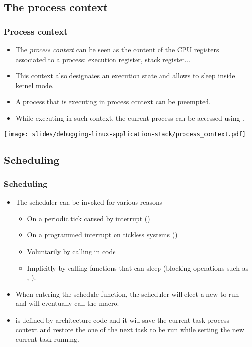 \subsection{The process context}

\begin{frame}
  \frametitle{Process context}
  \begin{itemize}
    \item The \emph{process context} can be seen as the content of
    the CPU registers associated to a process: execution register, stack register...
    \item This context also designates an execution state and allows to sleep
          inside kernel mode.
    \item A process that is executing in process context can be preempted.
    \item While executing in such context, the current process
           can be accessed using .
  \end{itemize}
  \vspace{0.5cm}
  \texttt{[image: slides/debugging-linux-application-stack/process\_context.pdf]}
\end{frame}

\subsection{Scheduling}

\begin{frame}[fragile]
  \frametitle{Scheduling}
  \begin{itemize}
    \item The scheduler can be invoked for various reasons
    \begin{itemize}
      \item On a periodic tick caused by interrupt ()
      \item On a programmed interrupt on tickless systems ()
      \item Voluntarily by calling  in code
      \item Implicitly by calling functions that can sleep (blocking
            operations such as , ).
    \end{itemize}
    \item When entering the schedule function, the scheduler will elect a new
           to run and will eventually call the
           macro.
    \item {} is defined by architecture code and it will save
          the current task process context and restore the one of the next task
          to be run while setting the new current task running.
  \end{itemize}
\end{frame}

